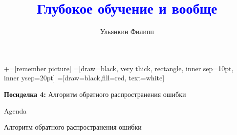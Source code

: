 \documentclass[notes,12pt, aspectratio=169]{beamer}
\title[]{\textcolor{blue}{Глубокое обучение и вообще}}
\author{Ульянкин Филипп}
\date{ }
\newenvironment{wideitemize}{\itemize\addtolength{\itemsep}{10pt}}{\enditemize}
\begin{document}
\newcommand\marktopleft[1]{%
    \tikz[overlay,remember picture] 
        \node (marker-#1-a) at (-.3em,.3em) {};%
}
\newcommand\markbottomright[2]{%
    \tikz[overlay,remember picture] 
        \node (marker-#1-b) at (0em,0em) {};%
}
+=[remember picture] 
 =[draw=black, very thick, rectangle, inner sep=10pt, inner ysep=20pt]
 =[draw=black,fill=red, text=white]


\begin{frame}
\maketitle
\centering \textbf{\color{blue} Посиделка 4:}  Алгоритм обратного распространения ошибки
\end{frame}

\begin{frame}{Agenda}
\begin{wideitemize}
	\item Алгоритм обратного распространения ошибки 
\end{wideitemize} 
\end{frame}
\end{document}
